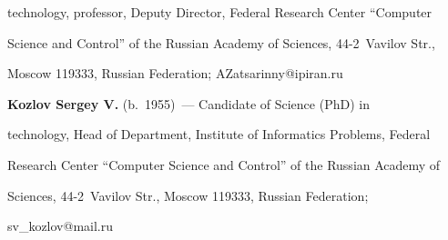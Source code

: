 technology, professor, Deputy Director, Federal Research Center ``Computer 


Science and Control'' of the Russian Academy of Sciences, 44-2~Vavilov Str., 


Moscow 119333, Russian Federation; \mbox{AZatsarinny@ipiran.ru} 








\vspace*{3pt}





\noindent


\textbf{Kozlov Sergey V.} (b.\ 1955)~--- Candidate of Science (PhD) in 


technology, Head of Department, Institute of Informatics Problems, Federal 


Research Center ``Computer Science and Control'' of the Russian Academy of 


Sciences, 44-2~Vavilov Str., Moscow 119333, Russian Federation; 


\mbox{sv\_kozlov@mail.ru}


\label{end\stat}








\renewcommand{\bibname}{\protect\rm Литература}


